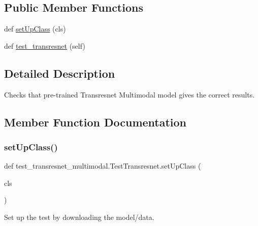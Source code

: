 \subsection*{Public Member Functions}
\begin{DoxyCompactItemize}
\item 
def \hyperlink{classtest__transresnet__multimodal_1_1TestTransresnet_ac013f711d027118f9d5db92c63659a80}{set\+Up\+Class} (cls)
\item 
def \hyperlink{classtest__transresnet__multimodal_1_1TestTransresnet_a812e5b711af8dfc4edd18dd4862928d5}{test\+\_\+transresnet} (self)
\end{DoxyCompactItemize}


\subsection{Detailed Description}
\begin{DoxyVerb}Checks that pre-trained Transresnet Multimodal model gives the correct results.
\end{DoxyVerb}
 

\subsection{Member Function Documentation}
\mbox{\label{classtest__transresnet__multimodal_1_1TestTransresnet_ac013f711d027118f9d5db92c63659a80}} 
\subsubsection{\texorpdfstring{set\+Up\+Class()}{setUpClass()}}
{\footnotesize\ttfamily def test\+\_\+transresnet\+\_\+multimodal.\+Test\+Transresnet.\+set\+Up\+Class (\begin{DoxyParamCaption}\item[{}]{cls }\end{DoxyParamCaption})}

\begin{DoxyVerb}Set up the test by downloading the model/data.
\end{DoxyVerb}
 \mbox{\label{classtest__transresnet__multimodal_1_1TestTransresnet_a812e5b711af8dfc4edd18dd4862928d5}} 
